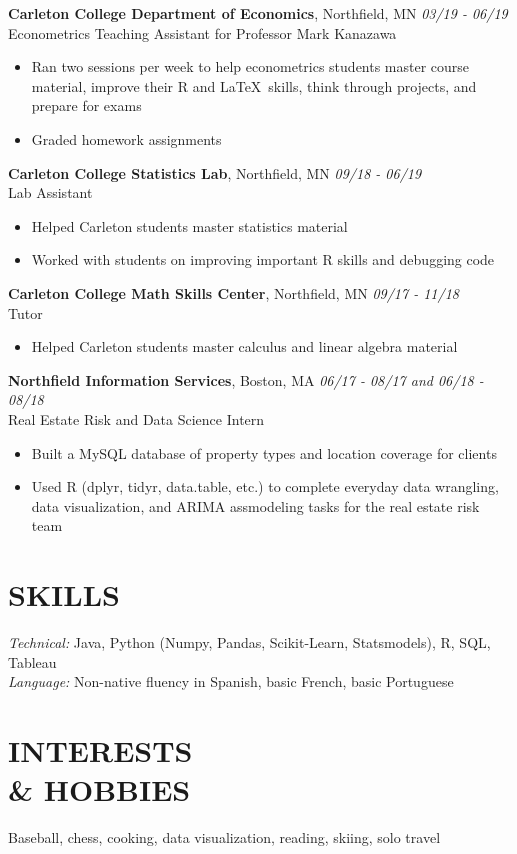 \documentclass[margin, 10pt]{res} %
\begin{document}
\begin{resume}
{\sl} \textbf{Carleton College Department of Economics}, Northfield, MN \hfill \textit{03/19 - 06/19}\\
{\sl} Econometrics Teaching Assistant for Professor Mark Kanazawa\smallskip
{\sl} \begin{itemize}
	\item Ran two sessions per week to help econometrics students master course material, improve their R and \LaTeX \ skills, think through projects, and prepare for exams
	\item Graded homework assignments
\end{itemize}


{\sl} \textbf{Carleton College Statistics Lab}, Northfield, MN \hfill \textit{09/18 - 06/19}\\
{\sl} Lab Assistant \smallskip
{\sl} \begin{itemize}
\item Helped Carleton students master statistics material
\item Worked with students on improving important R skills and debugging code
\end{itemize}

{\sl} \textbf{Carleton College Math Skills Center}, Northfield, MN \hfill \textit{09/17 - 11/18}\\
{\sl} Tutor \smallskip
{\sl} \begin{itemize}
\item Helped Carleton students master calculus and linear algebra material
\end{itemize}

{\sl} \textbf{Northfield Information Services}, Boston, MA \hfill \textit{06/17 - 08/17 and 06/18 - 08/18}\\
{\sl} Real Estate Risk and Data Science Intern \smallskip
{\sl} \begin{itemize}
\item Built a MySQL database of property types and location coverage for clients
\item Used R (dplyr, tidyr, data.table, etc.) to complete everyday data wrangling, data visualization, and ARIMA assmodeling tasks for the real estate risk team
\end{itemize}


\section{SKILLS}
{\sl Technical:} Java, Python (Numpy, Pandas, Scikit-Learn, Statsmodels), R, SQL, Tableau\\ \smallskip
{\sl Language:} Non-native fluency in Spanish, basic French, basic Portuguese

\section{INTERESTS \\\& HOBBIES}
{\sl} Baseball, chess, cooking, data visualization, reading, skiing, solo travel

\end{resume}
\end{document}
